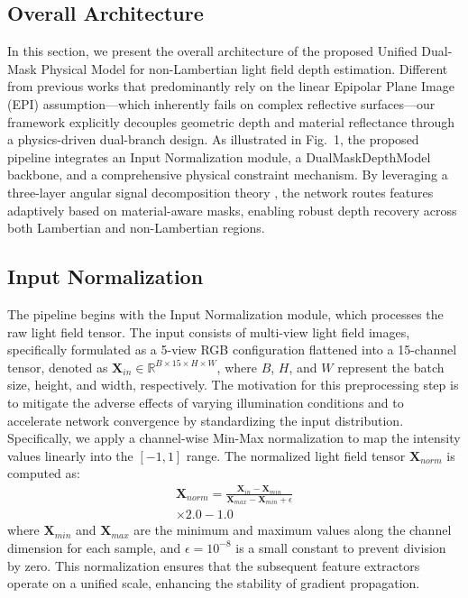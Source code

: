 \documentclass[lettersize,journal]{IEEEtran}
\begin{document}
\subsection{Overall Architecture}

In this section, we present the overall architecture of the proposed Unified Dual-Mask Physical Model for non-Lambertian light field depth estimation. Different from previous works that predominantly rely on the linear Epipolar Plane Image (EPI) assumption---which inherently fails on complex reflective surfaces---our framework explicitly decouples geometric depth and material reflectance through a physics-driven dual-branch design. As illustrated in Fig.~1, the proposed pipeline integrates an Input Normalization module, a DualMaskDepthModel backbone, and a comprehensive physical constraint mechanism. By leveraging a three-layer angular signal decomposition theory \cite{ng2005}, the network routes features adaptively based on material-aware masks, enabling robust depth recovery across both Lambertian and non-Lambertian regions.

\subsection{Input Normalization}

The pipeline begins with the Input Normalization module, which processes the raw light field tensor. The input consists of multi-view light field images, specifically formulated as a 5-view RGB configuration flattened into a 15-channel tensor, denoted as $\mathbf{X}_{in} \in \mathbb{R}^{B \times 15 \times H \times W}$, where $B$, $H$, and $W$ represent the batch size, height, and width, respectively. The motivation for this preprocessing step is to mitigate the adverse effects of varying illumination conditions and to accelerate network convergence by standardizing the input distribution. Specifically, we apply a channel-wise Min-Max normalization to map the intensity values linearly into the $[-1, 1]$ range. The normalized light field tensor $\mathbf{X}_{norm}$ is computed as:
\begin{multline}
\mathbf{X}_{norm} = \frac{\mathbf{X}_{in} - \mathbf{X}_{min}}{\mathbf{X}_{max} - \mathbf{X}_{min} + \epsilon} \\
\times 2.0 - 1.0
\end{multline}
where $\mathbf{X}_{min}$ and $\mathbf{X}_{max}$ are the minimum and maximum values along the channel dimension for each sample, and $\epsilon = 10^{-8}$ is a small constant to prevent division by zero. This normalization ensures that the subsequent feature extractors operate on a unified scale, enhancing the stability of gradient propagation.
\end{document}

